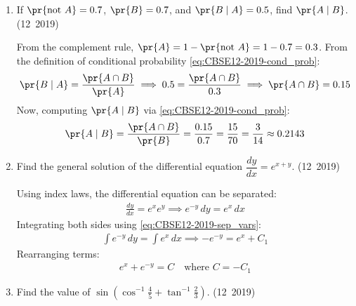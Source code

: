 \begin{enumerate}[label=\thesubsection.\arabic*, ref=\thesubsection.\theenumi]
\item If $\pr{\text{not } A} = 0.7$, $\pr{B} = 0.7$, and $\pr{B \mid A} = 0.5$, find $\pr{A \mid B}$.
\hfill (12~2019)

\solution
From the complement rule, $\pr{A} = 1 - \pr{\text{not } A} = 1 - 0.7 = 0.3$.
From the definition of conditional probability \eqref{eq:CBSE12-2019-cond_prob}:
\begin{align}
	\pr{B \mid A} = \frac{\pr{A \cap B}}{\pr{A}} \implies 0.5 = \frac{\pr{A \cap B}}{0.3} \implies \pr{A \cap B} = 0.15
\end{align}
Now, computing $\pr{A \mid B}$ via \eqref{eq:CBSE12-2019-cond_prob}:
\begin{align}
	\pr{A \mid B} = \frac{\pr{A \cap B}}{\pr{B}} = \frac{0.15}{0.7} = \frac{15}{70} = \frac{3}{14} \approx 0.2143
\end{align}


\item Find the general solution of the differential equation $\dfrac{dy}{dx} = e^{x+y}$.
\hfill (12~2019)

\solution
Using index laws, the differential equation can be separated:
\begin{align}
	\frac{dy}{dx} = e^x e^y \implies e^{-y}\,dy = e^x\,dx
\end{align}
Integrating both sides using \eqref{eq:CBSE12-2019-sep_vars}:
\begin{align}
	\int e^{-y}\,dy = \int e^x\,dx \implies -e^{-y} = e^x + C_1
\end{align}
Rearranging terms:
\begin{align}
	e^x + e^{-y} = C \quad \text{where } C = -C_1
\end{align}


\item Find the value of $\sin\left(\cos^{-1}\frac{4}{5} + \tan^{-1}\frac{2}{3}\right)$.
\hfill (12~2019)


\end{enumerate}
